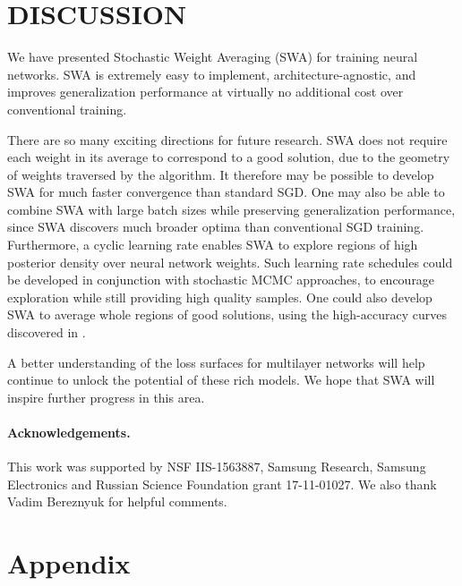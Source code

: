 \documentclass[letterpaper]{article}
\begin{document}
\section{DISCUSSION}

We have presented Stochastic Weight Averaging (SWA) for training neural networks. 
SWA is extremely easy to implement, architecture-agnostic, and improves generalization
performance at virtually no additional cost over conventional training.  

There are so many exciting directions for future research. 
SWA does not require each weight in its average to correspond to a good solution, due to the 
geometry of weights traversed by the algorithm.  It therefore may be  
possible to develop SWA for much faster
convergence than standard SGD.  One may also be able to 
combine SWA with large batch sizes while preserving generalization performance, 
since SWA discovers much broader optima than conventional 
SGD training.  Furthermore, a cyclic learning rate enables SWA to
explore regions of high posterior density over neural network weights.
Such learning rate schedules could be developed in conjunction with 
stochastic MCMC approaches, to encourage exploration while still providing 
high quality samples.  One could also develop SWA to average whole regions
of good solutions, using the high-accuracy curves discovered in \citet{garipov2018}.

A better understanding of the loss surfaces for multilayer networks will help continue to 
unlock the potential of these rich models. 
We hope that SWA will inspire further progress in this area.

\paragraph{Acknowledgements.} This work was supported by NSF
IIS-1563887, Samsung Research, Samsung Electronics and
Russian Science Foundation grant 17-11-01027. We also thank Vadim Bereznyuk for 
helpful comments.



\appendix

\vspace{-2mm}
\section{Appendix}
\end{document}
